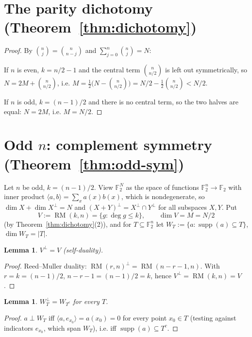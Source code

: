 \documentclass{amsart}
\newtheorem{lemma}[theorem]{Lemma}
\theoremstyle{definition}
\DeclareMathOperator{\supp}{supp}
\DeclareMathOperator{\RM}{RM}
\newcommand{\F}{\mathbb{F}}
\begin{document}
\section{The parity dichotomy (Theorem~\ref{thm:dichotomy})}

\begin{proof}
By $\binom nj=\binom n{n-j}$ and $\sum_{j=0}^n\binom nj=N$:

If $n$ is even, $k=n/2-1$ and the central term $\binom n{n/2}$ is left out
symmetrically, so $N=2M+\binom n{n/2}$, i.e.
$M=\tfrac12\bigl(N-\binom n{n/2}\bigr)=N/2-\tfrac12\binom n{n/2}<N/2$.

If $n$ is odd, $k=(n-1)/2$ and there is no central term, so the two halves
are equal: $N=2M$, i.e. $M=N/2$.
\end{proof}

\section{Odd $n$: complement symmetry (Theorem~\ref{thm:odd-sym})}
\label{sec:odd-sym}

Let $n$ be odd, $k=(n-1)/2$. View $\F_2^{N}$ as the space of functions
$\F_2^n\to\F_2$ with inner product
$\langle a,b\rangle=\sum_{x}a(x)b(x)$, which is nondegenerate, so
$\dim X+\dim X^{\perp}=N$ and $(X+Y)^{\perp}=X^{\perp}\cap Y^{\perp}$ for
all subspaces $X,Y$. Put
\[
V:=\RM(k,n)=\{g:\deg g\le k\},\qquad \dim V=M=N/2
\]
(by Theorem~\ref{thm:dichotomy}(2)), and for $T\subseteq\F_2^n$ let
$W_T:=\{a:\supp(a)\subseteq T\}$, $\dim W_T=|T|$.

\begin{lemma}\label{lem:selfdual}
$V^{\perp}=V$ (self-duality).
\end{lemma}
\begin{proof}
Reed--Muller duality: $\RM(r,n)^{\perp}=\RM(n-r-1,n)$. With $r=k=(n-1)/2$,
$n-r-1=(n-1)/2=k$, hence $V^{\perp}=\RM(k,n)=V$.
\end{proof}

\begin{lemma}\label{lem:WTdual}
$W_T^{\perp}=W_{T^c}$ for every $T$.
\end{lemma}
\begin{proof}
$a\perp W_T$ iff $\langle a,e_{x_0}\rangle=a(x_0)=0$ for every point
$x_0\in T$ (testing against indicators $e_{x_0}$, which span $W_T$), i.e.
iff $\supp(a)\subseteq T^c$.
\end{proof}
\end{document}
